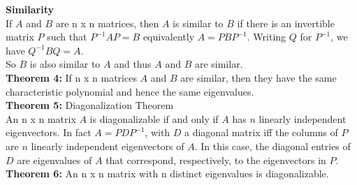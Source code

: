 \documentclass[14pt]{extreport}
\begin{document}
\textbf{Similarity}\\
If $A$ and $B$ are n x n matrices, then $A$ is similar to $B$ if there is an invertible matrix $P$ such that $P^{-1}AP = B$ equivalently $A = PBP^{-1}$. Writing $Q$ for $P^{-1}$, we have $Q^{-1}BQ = A$.\\
So $B$ is also similar to $A$ and thus $A$ and $B$ are similar.\\

\textbf{Theorem 4: }If n x n matrices $A$ and $B$ are similar, then they have the same characteristic polynomial and hence the same eigenvalues.\\

\textbf{Theorem 5:} Diagonalization Theorem\\
An n x n matrix $A$ is diagonalizable if and only if $A$ has $n$ linearly independent eigenvectors. In fact $A = PDP^{-1}$, with $D$ a diagonal matrix iff the columns of $P$ are $n$ linearly independent
eigenvectors of $A$. In this case, the diagonal entries of $D$ are eigenvalues of $A$ that correspond, respectively, to the eigenvectors in $P$.\\

\textbf{Theorem 6: } An n x n matrix with n distinct eigenvalues is diagonalizable.\\\\
\end{document}
